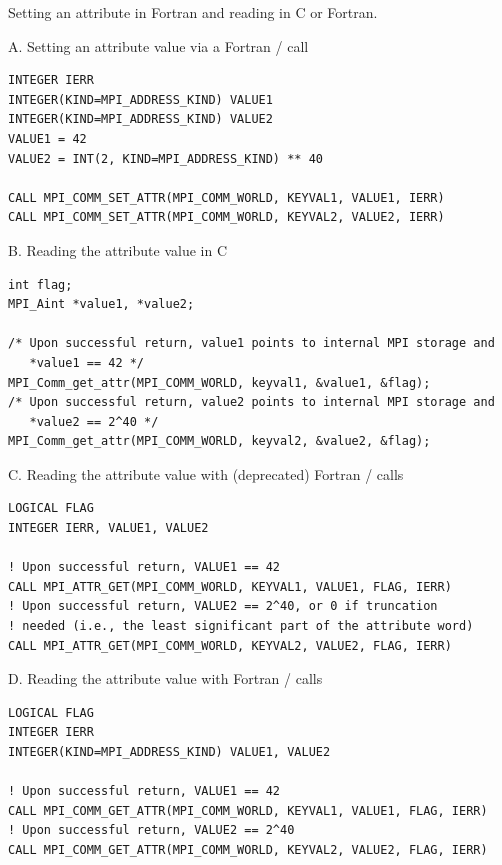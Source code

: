 \label{exa:misc-attr:f-new:pagebegin}

\begin{example}
\label{exa:misc-attr:f-new}%
Setting an attribute in Fortran and reading in C or Fortran.
%

A. Setting an attribute value via a Fortran \MPIII/ call

\begin{lstlisting}[language={[MPI]Fortran}]
INTEGER IERR
INTEGER(KIND=MPI_ADDRESS_KIND) VALUE1
INTEGER(KIND=MPI_ADDRESS_KIND) VALUE2
VALUE1 = 42
VALUE2 = INT(2, KIND=MPI_ADDRESS_KIND) ** 40

CALL MPI_COMM_SET_ATTR(MPI_COMM_WORLD, KEYVAL1, VALUE1, IERR)
CALL MPI_COMM_SET_ATTR(MPI_COMM_WORLD, KEYVAL2, VALUE2, IERR)
\end{lstlisting}

B. Reading the attribute value in C

\begin{lstlisting}[language={[MPI]C}]
int flag;
MPI_Aint *value1, *value2;

/* Upon successful return, value1 points to internal MPI storage and
   *value1 == 42 */
MPI_Comm_get_attr(MPI_COMM_WORLD, keyval1, &value1, &flag);
/* Upon successful return, value2 points to internal MPI storage and
   *value2 == 2^40 */
MPI_Comm_get_attr(MPI_COMM_WORLD, keyval2, &value2, &flag);
\end{lstlisting}

C. Reading the attribute value with (deprecated) Fortran \MPII/ calls

\begin{lstlisting}[language={[MPI]Fortran}]
LOGICAL FLAG
INTEGER IERR, VALUE1, VALUE2

! Upon successful return, VALUE1 == 42
CALL MPI_ATTR_GET(MPI_COMM_WORLD, KEYVAL1, VALUE1, FLAG, IERR)
! Upon successful return, VALUE2 == 2^40, or 0 if truncation
! needed (i.e., the least significant part of the attribute word)
CALL MPI_ATTR_GET(MPI_COMM_WORLD, KEYVAL2, VALUE2, FLAG, IERR)
\end{lstlisting}

D. Reading the attribute value with Fortran \MPIII/ calls

\begin{lstlisting}[language={[MPI]Fortran}]
LOGICAL FLAG
INTEGER IERR
INTEGER(KIND=MPI_ADDRESS_KIND) VALUE1, VALUE2

! Upon successful return, VALUE1 == 42
CALL MPI_COMM_GET_ATTR(MPI_COMM_WORLD, KEYVAL1, VALUE1, FLAG, IERR)
! Upon successful return, VALUE2 == 2^40
CALL MPI_COMM_GET_ATTR(MPI_COMM_WORLD, KEYVAL2, VALUE2, FLAG, IERR)
\end{lstlisting}
\end{example}


